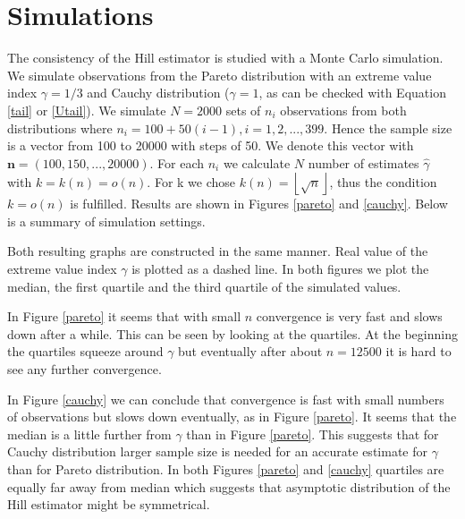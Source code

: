 \documentclass[english,12pt,a4paper,pdftex,sci,utf8]{aaltothesis} %
\begin{document}
\clearpage
\section{Simulations}
\label{simut}

The consistency of the Hill estimator is studied with a Monte Carlo simulation. We simulate observations from the Pareto distribution with an extreme value index $\gamma=1/3$ and Cauchy distribution ($\gamma=1$, as can be checked with Equation \eqref{tail} or \eqref{Utail}). We simulate $N=2000$ sets of $n_i$ observations from both distributions where $n_i=100+50(i-1), i=1,2,...,399$. Hence the sample size is a vector from 100 to 20000 with steps of 50. We denote this vector with $\textbf{n}=(100,150,...,20000)$. For each $n_i$ we calculate $N$ number of estimates $\hat{\gamma}$ with $k=k(n)=o(n)$. For k we chose $k(n)=\left \lfloor \sqrt{n} \right \rfloor$, thus the condition $k=o(n)$ is fulfilled. Results are shown in Figures \ref{pareto} and \ref{cauchy}. Below is a summary of simulation settings.


Both resulting graphs are constructed in the same manner. Real value of the extreme value index $\gamma$  is plotted as a dashed line. In both figures we plot the median, the first quartile and the third quartile of the simulated values.

In Figure \ref{pareto} it seems that with small $n$ convergence is very fast and slows down after a while. This can be seen by looking at the quartiles. At the beginning the quartiles squeeze around $\gamma$ but eventually after about $n=12500$ it is hard to see any further convergence.

In Figure \ref{cauchy} we can conclude that convergence is fast with small numbers of observations but slows down eventually, as in Figure \ref{pareto}. It seems that the median is a little further from $\gamma$ than in Figure \ref{pareto}. This suggests that for Cauchy distribution larger sample size is needed for an accurate estimate for $\gamma$ than for Pareto distribution. In both Figures \ref{pareto} and \ref{cauchy} quartiles are equally far away from median which suggests that asymptotic distribution of the Hill estimator might be symmetrical.
\end{document}
